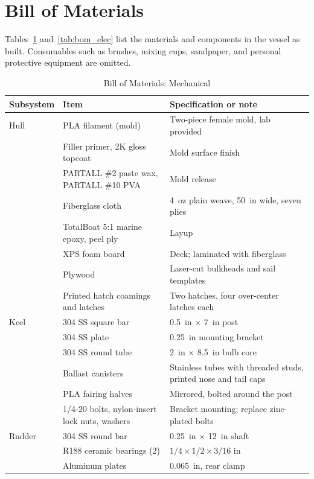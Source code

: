 \section{Bill of Materials}
\label{app:bom}
Tables~\ref{tab:bom_mech} and~\ref{tab:bom_elec} list the materials and
components in the vessel as built. Consumables such as brushes, mixing cups,
sandpaper, and personal protective equipment are omitted.

\begin{table}[!t]
\caption{Bill of Materials: Mechanical}
\label{tab:bom_mech}
\centering
\footnotesize
\begin{tabular}{@{}p{}p{}p{}@{}}
\toprule
Subsystem & Item & Specification or note \\
\midrule
Hull & PLA filament (mold) & Two-piece female mold, lab provided \\
     & Filler primer, 2K gloss topcoat & Mold surface finish \\
     & PARTALL \#2 paste wax, PARTALL \#10 PVA & Mold release \\
     & Fiberglass cloth & \SI{4}{oz} plain weave, \SI{50}{in} wide, seven plies \\
     & TotalBoat 5:1 marine epoxy, peel ply & Layup \\
     & XPS foam board & Deck; laminated with fiberglass \\
     & Plywood & Laser-cut bulkheads and sail templates \\
     & Printed hatch coamings and latches & Two hatches, four over-center latches each \\
Keel & 304 SS square bar & \SI{0.5}{in} $\times$ \SI{7}{in} post \\
     & 304 SS plate & \SI{0.25}{in} mounting bracket \\
     & 304 SS round tube & \SI{2}{in} $\times$ \SI{8.5}{in} bulb core \\
     & Ballast canisters & Stainless tubes with threaded studs, printed nose and tail caps \\
     & PLA fairing halves & Mirrored, bolted around the post \\
     & 1/4-20 bolts, nylon-insert lock nuts, washers & Bracket mounting; replace zinc-plated bolts \\
Rudder & 304 SS round bar & \SI{0.25}{in} $\times$ \SI{12}{in} shaft \\
       & R188 ceramic bearings (2) & $1/4 \times 1/2 \times 3/16$ in \\
       & Aluminum plates & \SI{0.065}{in}, rear clamp \\

\end{tabular}
\end{table}
